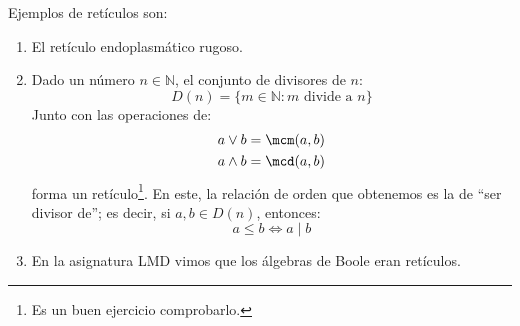 \begin{ejemplo}
    Ejemplos de retículos son:
    \begin{enumerate}
        \item El retículo endoplasmático rugoso.
        \item Dado un número $n\in \mathbb{N}$, el conjunto de divisores de $n$:
            \begin{equation*}
                D(n) = \{m\in \mathbb{N}: m \text{\ divide a\ } n\}
            \end{equation*}
            Junto con las operaciones de:
            \begin{align*}
                a\lor b &= \mcm(a,b) \\
                a\land b &= \mcd(a,b) 
            \end{align*}
            forma un retículo\footnote{Es un buen ejercicio comprobarlo.}. En este, la relación de orden que obtenemos es la de ``ser divisor de''; es decir, si $a,b\in D(n)$, entonces:
            \begin{equation*}
                a\leq b \Longleftrightarrow a\mid b
            \end{equation*}
        \item En la asignatura LMD vimos que los álgebras de Boole eran retículos.
    \end{enumerate}
\end{ejemplo}

